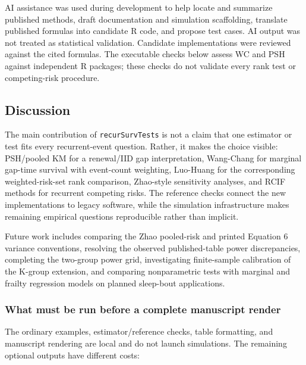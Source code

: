 \documentclass[
  12pt]{article}
\begin{document}
AI assistance was used during development to help locate and summarize
published methods, draft documentation and simulation scaffolding,
translate published formulas into candidate R code, and propose test
cases. AI output was not treated as statistical validation. Candidate
implementations were reviewed against the cited formulas. The executable
checks below assess WC and PSH against independent R packages; these
checks do not validate every rank test or competing-risk procedure.

\subsection{Discussion}\label{discussion}

The main contribution of \texttt{recurSurvTests} is not a claim that one
estimator or test fits every recurrent-event question. Rather, it makes
the choice visible: PSH/pooled KM for a renewal/IID gap interpretation,
Wang-Chang for marginal gap-time survival with event-count weighting,
Luo-Huang for the corresponding weighted-risk-set rank comparison,
Zhao-style sensitivity analyses, and RCIF methods for recurrent
competing risks. The reference checks connect the new implementations to
legacy software, while the simulation infrastructure makes remaining
empirical questions reproducible rather than implicit.

Future work includes comparing the Zhao pooled-risk and printed Equation
6 variance conventions, resolving the observed published-table power
discrepancies, completing the two-group power grid, investigating
finite-sample calibration of the K-group extension, and comparing
nonparametric tests with marginal and frailty regression models on
planned sleep-bout applications.

\subsubsection{What must be run before a complete manuscript
render}\label{what-must-be-run-before-a-complete-manuscript-render}

The ordinary examples, estimator/reference checks, table formatting, and
manuscript rendering are local and do not launch simulations. The
remaining optional outputs have different costs:
\end{document}
